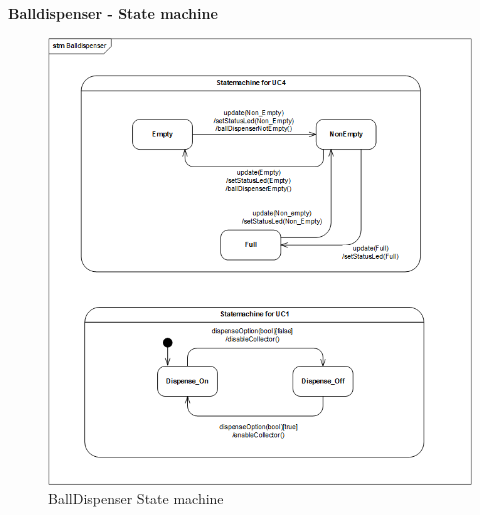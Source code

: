 \documentclass[Rapport/Rapport_main.tex]{subfiles}
\begin{document}
\textbf{Balldispenser - State machine}\\
\begin{figure}
    \centering
    \includegraphics{Arkitektur/Softwarearkitektur/Applikationsmodel/BallDispenser/graphicsBallDispenser/ApplikationsmodelBolddispenserstm.PNG}
    \caption{BallDispenser State machine}
    \label{fig:my_label}
\end{figure}
\end{document}
